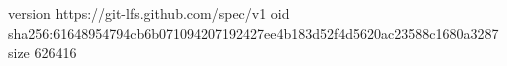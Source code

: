 version https://git-lfs.github.com/spec/v1
oid sha256:61648954794cb6b071094207192427ee4b183d52f4d5620ac23588c1680a3287
size 626416
